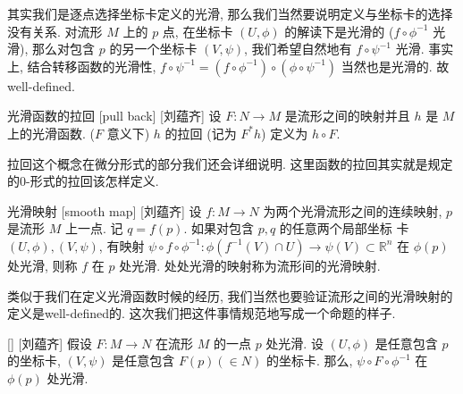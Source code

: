 \documentclass[UTF8]{ctexart}
\begin{document}
        \begin{rmk}
            []
            其实我们是逐点选择坐标卡定义的光滑, 那么我们当然要说明定义与坐标卡的选择没有关系. 对流形 \(M\) 上的 \(p\) 点, 在坐标卡 \((U,\phi)\) 的解读下是光滑的 (\(f \circ \phi^{-1}\) 光滑), 那么对包含 \(p\) 的另一个坐标卡 \((V,\psi)\), 我们希望自然地有 \(f \circ \psi^{-1}\) 光滑. 事实上, 结合转移函数的光滑性,  \(f \circ \psi^{-1} = (f \circ \phi^{-1}) \circ (\phi \circ \psi^{-1})\) 当然也是光滑的. 故well-defined. 
        \end{rmk}

        \begin{dfn}
            []
            {光滑函数的拉回}
            [pull back]
            [刘蕴齐]
            设 \(F:N \rightarrow M\) 是流形之间的映射并且 \(h\) 是 \(M\) 上的光滑函数. (\(F\) 意义下) \(h\) 的拉回 (记为 \(F^{*}h\)) 定义为 \(h \circ F\). 
        \end{dfn}

        \begin{rmk}
            []
            拉回这个概念在微分形式的部分我们还会详细说明. 这里函数的拉回其实就是规定的0-形式的拉回该怎样定义. 
        \end{rmk}

        \vspace{10pt}
        
        \begin{dfn}
            []
            {光滑映射}
            [smooth map]
            [刘蕴齐]
            设 \(f:M \rightarrow N \) 为两个光滑流形之间的连续映射,
             \(p\) 是流形 \(M\) 上一点. 记  \(q = f(p)\). 
            如果对包含 \(p,q\) 的任意两个局部坐标
            卡 \((U,\phi),(V,\psi)\),
            有映射 \( \psi \circ f \circ \phi^{-1}: \phi(f^{-1}(V) \cap U) \rightarrow \psi(V) \subset \mathbb{R}^n \)  在 \(\phi(p)\) 处光滑, 则称  \(f\)  在 \(p\) 处光滑. 
            处处光滑的映射称为流形间的光滑映射. 
        \end{dfn}

        类似于我们在定义光滑函数时候的经历, 我们当然也要验证流形之间的光滑映射的定义是well-defined的. 这次我们把这件事情规范地写成一个命题的样子. 

        \begin{ppt}
            []
            {}
            []
            [刘蕴齐]
            假设  \(F: M \rightarrow N \)  在流形 \(M\) 的一点 \(p\) 处光滑. 设  \((U, \phi)\)  是任意包含 \(p\) 的坐标卡,  \((V, \psi)\) 是任意包含 \(F(p)(\in N)\) 的坐标卡.  那么,  \( \psi \circ F \circ \phi^{-1} \) 在 \(\phi(p)\) 处光滑. 
        \end{ppt}
        
\end{document}
